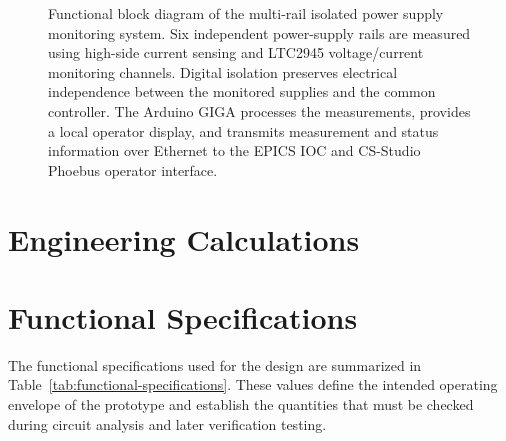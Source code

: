 \begin{figure}[H]
{{\begin{minipage}{0.9\textheight}
{%
                }

                \vspace{0.25cm}

                \caption{
                    Functional block diagram of the multi-rail isolated
                    power supply monitoring system. Six independent power-supply rails
                    are measured using high-side current sensing and LTC2945 voltage/current
                    monitoring channels. Digital isolation preserves electrical independence
                    between the monitored supplies and the common controller. The Arduino
                    GIGA processes the measurements, provides a local operator display, and
                    transmits measurement and status information over Ethernet to the EPICS
                    IOC and CS-Studio Phoebus operator interface.
                }
                \label{fig:functional-block-diagram}

            \end{minipage}%
        }%
    }

\end{figure}

\section{Engineering Calculations}
\label{sec:engineering-calculations}

\section{Functional Specifications}
\label{sec:functional-specifications}
The functional specifications used for the design are summarized in
Table~\ref{tab:functional-specifications}. These values define the intended
operating envelope of the prototype and establish the quantities that must be
checked during circuit analysis and later verification testing.

